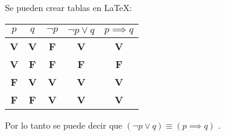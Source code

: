 \documentclass[12pt]{article}
\begin{document}
    Se pueden crear tablas en \LaTeX :

    \begin{table}[h]
        \centering
        \begin{tabular}{ c | c | c || c | c }
            \(p\)      & \(q\)      & \(\lnot p\) & \(\lnot p \lor q\) & \(p \implies q\) \\
            \hline \hline
            \textbf{V} & \textbf{V} & \textbf{F}  & \textbf{V}         & \textbf{V}       \\
            \textbf{V} & \textbf{F} & \textbf{F}  & \textbf{F}         & \textbf{F}       \\
            \textbf{F} & \textbf{V} & \textbf{V}  & \textbf{V}         & \textbf{V}       \\
            \textbf{F} & \textbf{F} & \textbf{V}  & \textbf{V}         & \textbf{V}       \\
        \end{tabular}

        Por lo tanto se puede decir que \( ( \lnot p \lor q ) \equiv ( p \implies q ) \) .
    \end{table}
\end{document}
